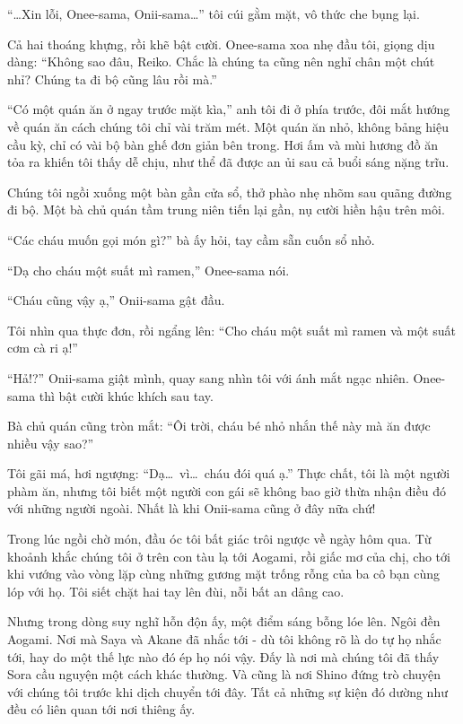 \documentclass[../main.tex]{subfiles}
\begin{document}
``\dots Xin lỗi, Onee-sama, Onii-sama\dots'' tôi cúi gằm mặt, vô thức che bụng lại.

Cả hai thoáng khựng, rồi khẽ bật cười. Onee-sama xoa nhẹ đầu tôi, giọng dịu dàng: ``Không sao đâu, Reiko. Chắc là chúng ta cũng nên nghỉ chân một chút nhỉ? Chúng ta đi bộ cũng lâu rồi mà.''

``Có một quán ăn ở ngay trước mặt kìa,'' anh tôi đi ở phía trước, đôi mắt hướng về quán ăn cách chúng tôi chỉ vài trăm mét. Một quán ăn nhỏ, không bảng hiệu cầu kỳ, chỉ có vài bộ bàn ghế đơn giản bên trong. Hơi ấm và mùi hương đồ ăn tỏa ra khiến tôi thấy dễ chịu, như thể đã được an ủi sau cả buổi sáng nặng trĩu.

Chúng tôi ngồi xuống một bàn gần cửa sổ, thở phào nhẹ nhõm sau quãng đường đi bộ. Một bà chủ quán tầm trung niên tiến lại gần, nụ cười hiền hậu trên môi.

``Các cháu muốn gọi món gì?'' bà ấy hỏi, tay cầm sẵn cuốn sổ nhỏ.

``Dạ cho cháu một suất mì ramen,'' Onee-sama nói.

``Cháu cũng vậy ạ,'' Onii-sama gật đầu.

Tôi nhìn qua thực đơn, rồi ngẩng lên: ``Cho cháu một suất mì ramen và một suất cơm cà ri ạ!''

``Hả!?'' Onii-sama giật mình, quay sang nhìn tôi với ánh mắt ngạc nhiên. Onee-sama thì bật cười khúc khích sau tay.

Bà chủ quán cũng tròn mắt: ``Ôi trời, cháu bé nhỏ nhắn thế này mà ăn được nhiều vậy sao?''

Tôi gãi má, hơi ngượng: ``Dạ\dots\ vì\dots\ cháu đói quá ạ.'' Thực chất, tôi là một người phàm ăn, nhưng tôi biết một người con gái sẽ không bao giờ thừa nhận điều đó với những người ngoài. Nhất là khi Onii-sama cũng ở đây nữa chứ!

Trong lúc ngồi chờ món, đầu óc tôi bất giác trôi ngược về ngày hôm qua. Từ khoảnh khắc chúng tôi ở trên con tàu lạ tới Aogami, rồi giấc mơ của chị, cho tới khi vướng vào vòng lặp cùng những gương mặt trống rỗng của ba cô bạn cùng lóp với họ. Tôi siết chặt hai tay lên đùi, nỗi bất an dâng cao.

Nhưng trong dòng suy nghĩ hỗn độn ấy, một điểm sáng bỗng lóe lên. Ngôi đền Aogami. Nơi mà Saya và Akane đã nhắc tới - dù tôi không rõ là do tự họ nhắc tới, hay do một thế lực nào đó ép họ nói vậy. Đấy là nơi mà chúng tôi đã thấy Sora cầu nguyện một cách khác thường. Và cũng là nơi Shino đứng trò chuyện với chúng tôi trước khi dịch chuyển tới đây. Tất cả những sự kiện đó dường như đều có liên quan tới nơi thiêng ấy.
\end{document}
